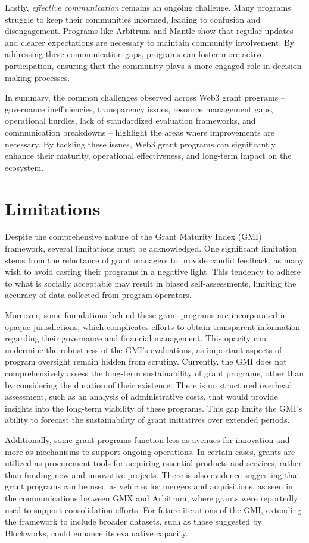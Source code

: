 \documentclass[a4,10pt]{article}
\begin{document}
Lastly, \textit{effective communication} remains an ongoing challenge. Many programs struggle to keep their communities informed, leading to confusion and disengagement. Programs like Arbitrum and Mantle show that regular updates and clearer expectations are necessary to maintain community involvement. By addressing these communication gaps, programs can foster more active participation, ensuring that the community plays a more engaged role in decision-making processes.

In summary, the common challenges observed across Web3 grant programs -- governance inefficiencies, transparency issues, resource management gaps, operational hurdles, lack of standardized evaluation frameworks, and communication breakdowns -- highlight the areas where improvements are necessary. By tackling these issues, Web3 grant programs can significantly enhance their maturity, operational effectiveness, and long-term impact on the ecosystem.

\section{Limitations}\label{sec_11}
Despite the comprehensive nature of the Grant Maturity Index (GMI) framework, several limitations must be acknowledged. One significant limitation stems from the reluctance of grant managers to provide candid feedback, as many wish to avoid casting their programs in a negative light. This tendency to adhere to what is socially acceptable may result in biased self-assessments, limiting the accuracy of data collected from program operators.

Moreover, some foundations behind these grant programs are incorporated in opaque jurisdictions, which complicates efforts to obtain transparent information regarding their governance and financial management. This opacity can undermine the robustness of the GMI’s evaluations, as important aspects of program oversight remain hidden from scrutiny. Currently, the GMI does not comprehensively assess the long-term sustainability of grant programs, other than by considering the duration of their existence. There is no structured overhead assessment, such as an analysis of administrative costs, that would provide insights into the long-term viability of these programs. This gap limits the GMI's ability to forecast the sustainability of grant initiatives over extended periods.

Additionally, some grant programs function less as avenues for innovation and more as mechanisms to support ongoing operations. In certain cases, grants are utilized as procurement tools for acquiring essential products and services, rather than funding new and innovative projects. There is also evidence suggesting that grant programs can be used as vehicles for mergers and acquisitions, as seen in the communications between GMX and Arbitrum, where grants were reportedly used to support consolidation efforts. For future iterations of the GMI, extending the framework to include broader datasets, such as those suggested by Blockworks, could enhance its evaluative capacity.
\end{document}
